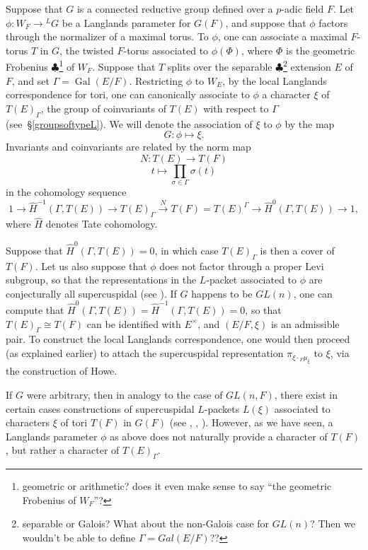 \documentclass[11pt]{amsart}
\theoremstyle{plain}
\newcommand{\MAxxx}[1]{$\clubsuit$\footnote{#1}}
\DeclareMathOperator{\Gal}{Gal}
\begin{document}
Suppose that $G$ is a connected reductive group defined over a $p$-adic field $F$.  Let
$\phi : W_F \rightarrow {}^L G$ be a Langlands parameter for $G(F)$, and suppose that $\phi$ factors through the
normalizer of a maximal torus. To $\phi$, one can associate a maximal $F$-torus $T$ in $G$, the twisted $F$-torus associated to $\phi(\Phi)$, where $\Phi$ is the geometric Frobenius \MAxxx{geometric or arithmetic?  does it even make sense to say ``the geometric Frobenius of $W_F$''?} of $W_F$.  Suppose that $T$
splits over the separable \MAxxx{separable or Galois?  What about the non-Galois case for $GL(n)$?  Then we wouldn't be able to define $\Gamma = Gal(E/F)$??} extension $E$ of $F$, and set $\Gamma = \Gal(E/F)$.  Restricting $\phi$ to $W_E$, by the local Langlands correspondence for tori,
one can canonically associate to $\phi$ a character $\xi$ of $T(E)_{\Gamma}$,
the group of coinvariants of $T(E)$ with respect to $\Gamma$ (see~\S\ref{groupsoftypeL}).  We will denote the association of $\xi$ to $\phi$ by the map $$G : \phi \mapsto \xi.$$
Invariants and coinvariants are related by the norm map
$$N : T(E) \rightarrow T(F)$$ $$t \mapsto \displaystyle\prod_{\sigma \in \Gamma} \sigma(t)$$
in the cohomology sequence
$$1 \rightarrow \hat{H}^{-1}(\Gamma,T(E)) \rightarrow T(E)_{\Gamma} \xrightarrow{N} T(F)
= T(E)^{\Gamma} \rightarrow \hat{H}^0(\Gamma,T(E)) \rightarrow 1,$$ where $\hat{H}$ denotes Tate cohomology.

Suppose that $\hat{H}^0(\Gamma, T(E)) = 0$, in which case $T(E)_{\Gamma}$ is then a cover of $T(F)$.  Let us also suppose that $\phi$ does not factor through a proper Levi subgroup, so that the representations in the $L$-packet associated to $\phi$ are conjecturally all supercuspidal (see \cite[\S 3.5]{debackerreeder}).  If $G$ happens to be $GL(n)$, one can compute that $\hat{H}^{0}(\Gamma, T(E)) = \hat{H}^{-1}(\Gamma, T(E)) = 0$, so that $T(E)_{\Gamma} \cong T(F)$ can be identified with $E^{\times}$, and $(E/F, \xi)$ is an admissible pair.  To construct the local Langlands correspondence, one would then proceed (as explained earlier) to attach the supercuspidal representation $\pi_{\xi \cdot {}_F \mu_{\xi}}$ to $\xi$, via the construction of Howe.

If $G$ were arbitrary, then in analogy to the case of $GL(n,F)$, there exist in certain cases constructions of supercuspidal $L$-packets $L(\xi)$ associated to characters $\xi$ of tori $T(F)$ in $G(F)$ (see \cite{debackerreeder}, \cite{kaletha}, \cite{reeder}).  However, as we have seen, a Langlands parameter $\phi$ as above does not naturally provide a character of $T(F)$, but rather a character of $T(E)_{\Gamma}$.
\end{document}
